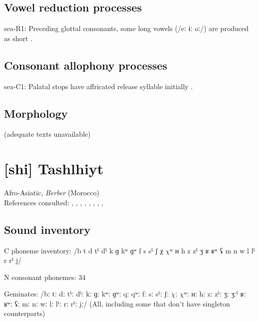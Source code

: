 {\subsection*{Vowel reduction processes}
\begin{appendixdesc}

\item[sea-R1:] Preceding glottal consonants, some long vowels (/eː ɨː oː/) are produced as short \citep[10--11]{Philips2007}.
\end{appendixdesc}
\subsection*{Consonant allophony processes}
\begin{appendixdesc}

\item[sea-C1:] Palatal stops have affricated release syllable initially \citep[5]{Philips2007}.
\end{appendixdesc}
\subsection*{Morphology}

(adequate texts unavailable)

\section*{[shi] Tashlhiyt}   %
Afro-Asiatic, \textit{Berber} (Morocco)\medskip\\
References consulted: \citet{Coleman2001}, \citet{DellElmedlaoui2002}, \citet{GordonNafi2012}, \citet{PuechLouali1999}, \citet{Ridouane2002}, \citet{Ridouane2007}, \citet{Ridouane2008}, \citet{Ridouane2014}, \citet{RoettgerEtAl2015}

\subsection*{Sound inventory}
\begin{appendixdesc}

\item[C phoneme inventory:] /b t d tˤ dˤ k ɡ kʷ ɡʷ f s sˤ ʃ χ $\chi ʷ$ ʜ h z zˤ ʒ ʁ ʁʷ ʢ m n w l lˤ r rˤ j/

\item[N consonant phonemes:] 34

\item[Geminates:] /bː tː dː tˤː dˤː kː ɡː kʷː ɡʷː qː qʷː fː sː sˤː ʃː $\chi ː$ $\chi ʷː$ ʜː hː zː zˤː ʒː ʒːˤ ʁː ʁʷː ʢː mː nː wː lː lˤː rː rˤː jː/ (All, including some that don’t have singleton counterparts)


\end{appendixdesc}}
